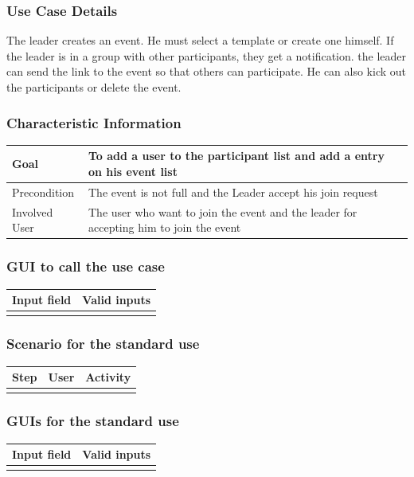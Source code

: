 \documentclass[12pt]{article}
\theoremstyle{definition}
\begin{document}
\subsubsection{Use Case Details}

The leader creates an event. He must select a template or create one himself. If the leader is in a group with other participants, they get a notification. the leader can send the link to the event so that others can participate. He can also kick out the participants or delete the event.

\subsubsection{Characteristic Information}

\begin{tabular}{|l|l|}
\hline
Goal & To add a user to the participant list and add a entry on his event list \\ \hline
Precondition &  The event is not full and the Leader accept his join request\\ \hline
Involved User &  The user who want to join the event and the leader for accepting him to join the event\\ \hline

\end{tabular}

\subsubsection{GUI to call the use case}

\begin{tabular}{|l|l|}
\hline
Input field & Valid inputs \\ \hline
 &  \\ \hline
\end{tabular}

\subsubsection{Scenario for the standard use}

\begin{tabular}{|l|l|l|}
\hline
Step & User & Activity \\ \hline
 & & \\ \hline
\end{tabular}

\subsubsection{GUIs for the standard use}
\begin{tabular}{|l|l|}
\hline
Input field & Valid inputs \\ \hline
 &  \\ \hline
\end{tabular}
\end{document}
